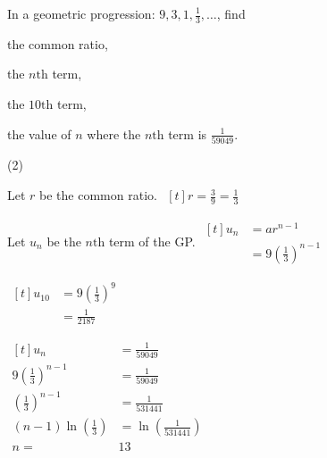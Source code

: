 \documentclass[11pt,a4paper]{book}
\begin{document}
\begin{example}

In a geometric progression: ${\displaystyle 9,3,1,\frac{1}{3},\ldots}$, find

\begin{tasks}[label=(\alph*),label-width=3.5ex] 

\task  the common ratio, 

\task  the $n\text{th}$ term,

\task  the $10\text{th}$ term,

\task  the value of $n$ where the $n\text{th}$ term is ${\displaystyle \frac{1}{59049}}$.

\end{tasks}

\Solution

\begin{tasks}[label=(\alph*),label-width=3.5ex](2)

\task  Let $r$ be the common ratio.
$
\begin{aligned}[t]
r=\frac{3}{9}=\frac{1}{3}
\end{aligned}
$

\task  Let $u_{n}$ be the $n\text{th}$ term of the GP. 
$
\begin{aligned}[t]
u_{n} & =ar^{n-1}\\
 & =9\left(\frac{1}{3}\right)^{n-1}
\end{aligned}
$

\task 
$
\begin{aligned}[t]
u_{10} & =9\left(\frac{1}{3}\right)^{9}\\
 & =\frac{1}{2187}
\end{aligned}
$

\task  
$
\begin{aligned}[t]
u_{n} & =\frac{1}{59049}\\
9\left(\frac{1}{3}\right)^{n-1} & =\frac{1}{59049}\\
\left(\frac{1}{3}\right)^{n-1} & =\frac{1}{531441}\\
\left(n-1\right)\ln\left(\frac{1}{3}\right) & =\ln\left(\frac{1}{531441}\right)\\
n= & 13
\end{aligned}
$

\end{tasks}

\end{example}
\end{document}
